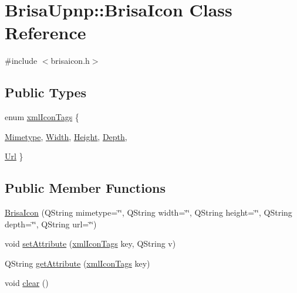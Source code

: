 \hypertarget{classBrisaUpnp_1_1BrisaIcon}{
\section{BrisaUpnp::BrisaIcon Class Reference}
\label{classBrisaUpnp_1_1BrisaIcon}
}


{\ttfamily \#include $<$brisaicon.h$>$}\subsection*{Public Types}
\begin{DoxyCompactItemize}
\item 
enum \hyperlink{classBrisaUpnp_1_1BrisaIcon_ad69ef700296b76bc80f8acf6c183ebc0}{xmlIconTags} \{ \par
\hyperlink{classBrisaUpnp_1_1BrisaIcon_ad69ef700296b76bc80f8acf6c183ebc0a79f8db54479f1fbcd4fdde2c99a3cc9e}{Mimetype}, 
\hyperlink{classBrisaUpnp_1_1BrisaIcon_ad69ef700296b76bc80f8acf6c183ebc0a124d455f61d5529aa4558b5112a2db65}{Width}, 
\hyperlink{classBrisaUpnp_1_1BrisaIcon_ad69ef700296b76bc80f8acf6c183ebc0a290631426eaca3be8346b35ecfda9368}{Height}, 
\hyperlink{classBrisaUpnp_1_1BrisaIcon_ad69ef700296b76bc80f8acf6c183ebc0ae400f6f3cafb74cd22012d416a8914d1}{Depth}, 
\par
\hyperlink{classBrisaUpnp_1_1BrisaIcon_ad69ef700296b76bc80f8acf6c183ebc0aa39531f49976ed4fc546b0680200e691}{Url}
 \}
\end{DoxyCompactItemize}
\subsection*{Public Member Functions}
\begin{DoxyCompactItemize}
\item 
\hyperlink{classBrisaUpnp_1_1BrisaIcon_a5ef224341789110c21dac95f2cffdcbf}{BrisaIcon} (QString mimetype=\char`\"{}\char`\"{}, QString width=\char`\"{}\char`\"{}, QString height=\char`\"{}\char`\"{}, QString depth=\char`\"{}\char`\"{}, QString url=\char`\"{}\char`\"{})
\item 
void \hyperlink{classBrisaUpnp_1_1BrisaIcon_a80c1dbe94bb9934d9d1114571f9b3579}{setAttribute} (\hyperlink{classBrisaUpnp_1_1BrisaIcon_ad69ef700296b76bc80f8acf6c183ebc0}{xmlIconTags} key, QString v)
\item 
QString \hyperlink{classBrisaUpnp_1_1BrisaIcon_a8aceaa9001dcabdd740f3442f3a262de}{getAttribute} (\hyperlink{classBrisaUpnp_1_1BrisaIcon_ad69ef700296b76bc80f8acf6c183ebc0}{xmlIconTags} key)
\item 
void \hyperlink{classBrisaUpnp_1_1BrisaIcon_af9af1189c483e43bc12636e13ac28cec}{clear} ()
\end{DoxyCompactItemize}


